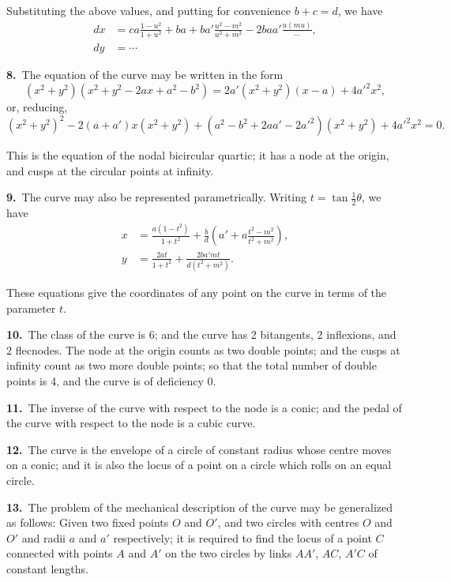 \documentclass[11pt,a4paper]{article}
\begin{document}
Substituting the above values, and putting for convenience $b+c = d$, we have
\begin{align*}
dx &= ca\frac{1-u^2}{1+u^2} + ba + ba'\frac{u^2-m^2}{u^2+m^2} - 2baa'\frac{u(mu)}{\cdots},\\
dy &= \cdots
\end{align*}

\newpage
\setcounter{page}{186}

\noindent\textbf{8.}\ The equation of the curve may be written in the form
\[
(x^2 + y^2)(x^2 + y^2 - 2ax + a^2 - b^2) = 2a'(x^2 + y^2)(x - a) + 4a'^2x^2,
\]
or, reducing,
\[
(x^2 + y^2)^2 - 2(a + a')x(x^2 + y^2) + (a^2 - b^2 + 2aa' - 2a'^2)(x^2 + y^2) + 4a'^2x^2 = 0.
\]

This is the equation of the nodal bicircular quartic; it has a node at the origin, and cusps at the circular points at infinity.

\textbf{9.}\ The curve may also be represented parametrically. Writing $t = \tan\tfrac{1}{2}\theta$, we have
\begin{align*}
x &= \frac{a(1-t^2)}{1+t^2} + \frac{b}{d}\left(a' + a\frac{t^2-m^2}{t^2+m^2}\right),\\
y &= \frac{2at}{1+t^2} + \frac{2ba'mt}{d(t^2+m^2)}.
\end{align*}

These equations give the coordinates of any point on the curve in terms of the parameter $t$.

\textbf{10.}\ The class of the curve is 6; and the curve has 2 bitangents, 2 inflexions, and 2 flecnodes. The node at the origin counts as two double points; and the cusps at infinity count as two more double points; so that the total number of double points is 4, and the curve is of deficiency 0.

\textbf{11.}\ The inverse of the curve with respect to the node is a conic; and the pedal of the curve with respect to the node is a cubic curve.

\textbf{12.}\ The curve is the envelope of a circle of constant radius whose centre moves on a conic; and it is also the locus of a point on a circle which rolls on an equal circle.

\newpage
\setcounter{page}{187}

\noindent\textbf{13.}\ The problem of the mechanical description of the curve may be generalized as follows: Given two fixed points $O$ and $O'$, and two circles with centres $O$ and $O'$ and radii $a$ and $a'$ respectively; it is required to find the locus of a point $C$ connected with points $A$ and $A'$ on the two circles by links $AA'$, $AC$, $A'C$ of constant lengths.
\end{document}
